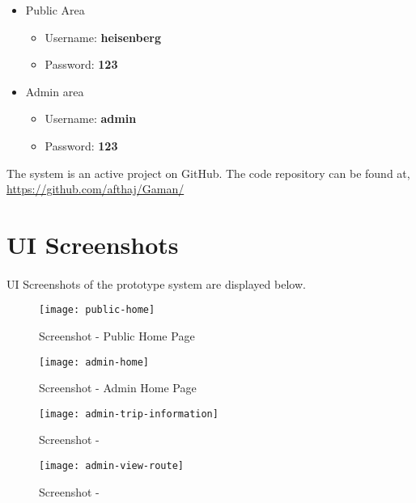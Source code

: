 \begin {itemize}

\item Public Area
\begin {itemize}
\item Username: \textbf{heisenberg}
\item Password: \textbf{123}
\end {itemize}

\item Admin area
\begin {itemize}
\item Username: \textbf{admin}
\item Password: \textbf{123}
\end {itemize}

\end {itemize}

The system is an active project on GitHub. The code repository can be found at, \url{https://github.com/afthaj/Gaman/}



\section{UI Screenshots}

\paragraph{} UI Screenshots of the prototype system are displayed below.

\begin {figure} [H]
\centering
\texttt{[image: public-home]}
\caption [Screenshot - Public Home Page] {Screenshot - Public Home Page}
\label {image-public-home}
\end {figure}

\begin {figure} [H]
\centering
\texttt{[image: admin-home]}
\caption [Screenshot - Admin Home Page] {Screenshot - Admin Home Page}
\label {image-admin-home}
\end {figure}

\begin {figure} [H]
\centering
\texttt{[image: admin-trip-information]}
\caption [Screenshot - ] {Screenshot - }
\label {image-admin-trip-information}
\end {figure}

\begin {figure} [H]
\centering
\texttt{[image: admin-view-route]}
\caption [Screenshot - ] {Screenshot - }
\label {image-admin-view-route}
\end {figure}

